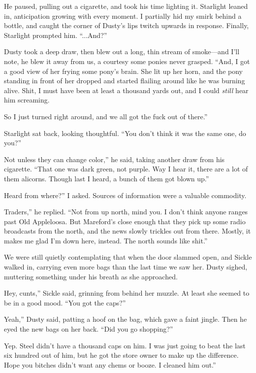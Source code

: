 He paused, pulling out a cigarette, and took his time lighting it. Starlight leaned in, anticipation growing with every moment. I partially hid my smirk behind a bottle, and caught the corner of Dusty’s lips twitch upwards in response. Finally, Starlight prompted him. “...And?”

Dusty took a deep draw, then blew out a long, thin stream of smoke—and I’ll note, he blew it away from us, a courtesy some ponies never grasped. “And, I got a good view of her frying some pony’s brain. She lit up her horn, and the pony standing in front of her dropped and started flailing around like he was burning alive. Shit, I must have been at least a thousand yards out, and I could \textit{still} hear him screaming.

\leavevmode{}So I just turned right around, and we all got the fuck out of there.”

Starlight sat back, looking thoughtful. “You don’t think it was the same one, do you?”

\leavevmode{}Not unless they can change color,” he said, taking another draw from his cigarette. “That one was dark green, not purple. Way I hear it, there are a lot of them alicorns. Though last I heard, a bunch of them got blown up.”

\leavevmode{}Heard from where?” I asked. Sources of information were a valuable commodity.

\leavevmode{}Traders,” he replied. “Not from up north, mind you. I don’t think anyone ranges past Old Appleloosa. But Mareford’s close enough that they pick up some radio broadcasts from the north, and the news slowly trickles out from there. Mostly, it makes me glad I’m down here, instead. The north sounds like shit.”

We were still quietly contemplating that when the door slammed open, and Sickle walked in, carrying even more bags than the last time we saw her. Dusty sighed, muttering something under his breath as she approached.

\leavevmode{}Hey, cunts,” Sickle said, grinning from behind her muzzle. At least she seemed to be in a good mood. “You got the caps?”

\leavevmode{}Yeah,” Dusty said, patting a hoof on the bag, which gave a faint jingle. Then he eyed the new bags on her back. “Did you go shopping?”

\leavevmode{}Yep. Steel didn’t have a thousand caps on him. I was just going to beat the last six hundred out of him, but he got the store owner to make up the difference. Hope you bitches didn’t want any chems or booze. I cleaned him out.”


